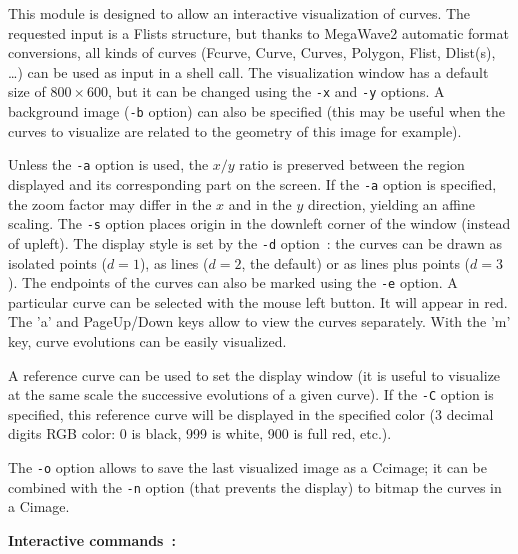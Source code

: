 This module is designed to allow an interactive visualization of curves.
The requested input is a Flists structure, but thanks to
MegaWave2 automatic format conversions, all kinds of curves 
(Fcurve, Curve, Curves, Polygon, Flist, Dlist(s), \ldots) can be 
used as input in a shell call. The visualization window has a default
size of $800\times 600$, but it can be changed using the \verb+-x+ and
\verb+-y+ options. A background image (\verb+-b+ option)
can also be specified (this may
be useful when the curves to visualize are related to the geometry of this
image for example). 

\medskip

Unless the \verb+-a+ option is used, the $x/y$ ratio is preserved between
the region displayed and its corresponding part on the screen.
If the \verb+-a+ option is specified, the zoom factor may differ in the
$x$ and in the $y$ direction, yielding an affine scaling. 
The \verb+-s+ option places origin in the downleft corner of the window
(instead of upleft). The display style is set by the \verb+-d+ option~:
the curves can be drawn as isolated points ($d=1$), as lines ($d=2$, 
the default) or as lines plus points ($d=3$). The endpoints of the curves
can also be marked using the \verb+-e+ option. 
A particular curve can be selected with the mouse left button. 
It will appear in red. The 'a' and PageUp/Down keys allow to 
view the curves separately. With the 'm' key, curve evolutions can
be easily visualized.

\medskip

A reference curve can be used to set the display window (it is useful to
visualize at the same scale the successive evolutions of a given curve). 
If the \verb+-C+ option is specified, this reference curve will be
displayed in the specified color (3 decimal digits RGB color: 
0 is black, 999 is white, 900 is full red, etc.).

\medskip

The \verb+-o+ option allows
to save the last visualized image as a Ccimage; it can be combined with
the \verb+-n+ option (that prevents the display) to bitmap the curves
in a Cimage.

\medskip

{\bf Interactive commands~:}
\medskip


